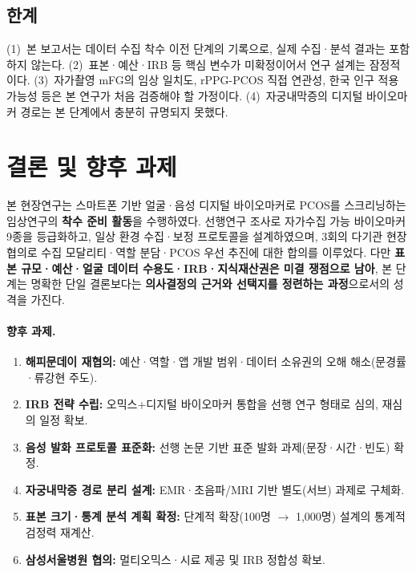 \documentclass[11pt,a4paper]{article}
\begin{document}
\subsection{한계}
(1)~본 보고서는 데이터 수집 착수 이전 단계의 기록으로, 실제 수집·분석 결과는 포함하지 않는다. (2)~표본·예산·IRB 등 핵심 변수가 미확정이어서 연구 설계는 잠정적이다. (3)~자가촬영 mFG의 임상 일치도, rPPG-PCOS 직접 연관성, 한국 인구 적용 가능성 등은 본 연구가 처음 검증해야 할 가정이다. (4)~자궁내막증의 디지털 바이오마커 경로는 본 단계에서 충분히 규명되지 못했다.

\section{결론 및 향후 과제}
본 현장연구는 스마트폰 기반 얼굴·음성 디지털 바이오마커로 PCOS를 스크리닝하는 임상연구의 \textbf{착수 준비 활동}을 수행하였다. 선행연구 조사로 자가수집 가능 바이오마커 9종을 등급화하고, 일상 환경 수집·보정 프로토콜을 설계하였으며, 3회의 다기관 현장 협의로 수집 모달리티·역할 분담·PCOS 우선 추진에 대한 합의를 이루었다. 다만 \textbf{표본 규모·예산·얼굴 데이터 수용도·IRB·지식재산권은 미결 쟁점으로 남아}, 본 단계는 명확한 단일 결론보다는 \textbf{의사결정의 근거와 선택지를 정련하는 과정}으로서의 성격을 가진다.

\paragraph{향후 과제.}
\begin{enumerate}
  \item \textbf{해피문데이 재협의:} 예산·역할·앱 개발 범위·데이터 소유권의 오해 해소(문경률·류강현 주도).
  \item \textbf{IRB 전략 수립:} 오믹스+디지털 바이오마커 통합을 선행 연구 형태로 심의, 재심의 일정 확보.
  \item \textbf{음성 발화 프로토콜 표준화:} 선행 논문 기반 표준 발화 과제(문장·시간·빈도) 확정.
  \item \textbf{자궁내막증 경로 분리 설계:} EMR·초음파/MRI 기반 별도(서브) 과제로 구체화.
  \item \textbf{표본 크기·통계 분석 계획 확정:} 단계적 확장(100명 $\rightarrow$ 1{,}000명) 설계의 통계적 검정력 재계산.
  \item \textbf{삼성서울병원 협의:} 멀티오믹스·시료 제공 및 IRB 정합성 확보.
\end{enumerate}

\end{document}
